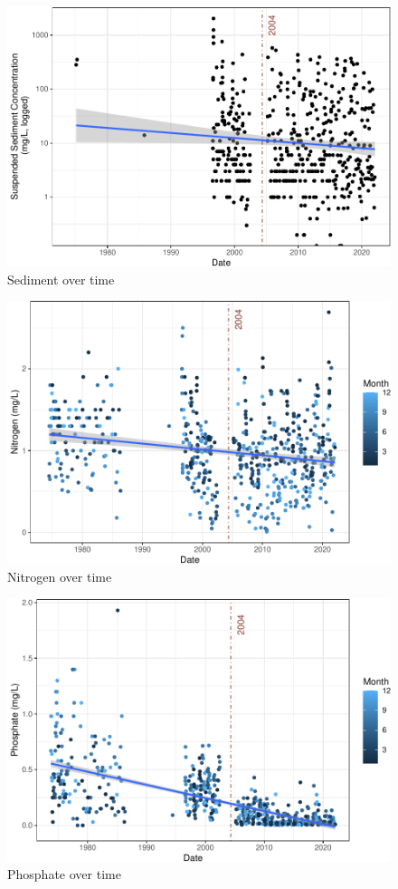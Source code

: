 \documentclass[
  12pt,
]{article}
\begin{document}
\begin{figure}
\centering
\includegraphics{Project_Script_files/figure-latex/exploration_plot2-1.pdf}
\caption{Sediment over time}
\end{figure}

\begin{figure}
\centering
\includegraphics{Project_Script_files/figure-latex/exploration_plot3-1.pdf}
\caption{Nitrogen over time}
\end{figure}

\begin{figure}
\centering
\includegraphics{Project_Script_files/figure-latex/exploration_plot4-1.pdf}
\caption{Phosphate over time}
\end{figure}
\end{document}

